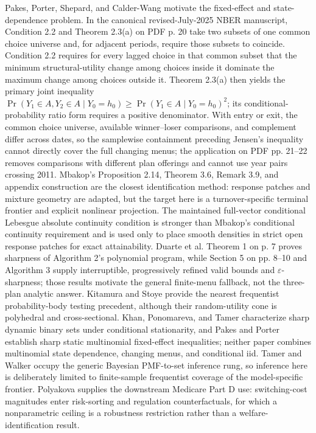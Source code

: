 \documentclass{article}
\begin{document}
Pakes, Porter, Shepard, and Calder-Wang motivate the fixed-effect and state-dependence problem. In the canonical revised-July-2025 NBER manuscript, Condition 2.2 and Theorem 2.3(a) on PDF p. 20 take two subsets of one common choice universe and, for adjacent periods, require those subsets to coincide. Condition 2.2 requires for every lagged choice in that common subset that the minimum structural-utility change among choices inside it dominate the maximum change among choices outside it. Theorem 2.3(a) then yields the primary joint inequality \(\Pr(Y_1\in A,Y_2\in A\mid Y_0=h_0)\ge\Pr(Y_1\in A\mid Y_0=h_0)^2\); its conditional-probability ratio form requires a positive denominator. With entry or exit, the common choice universe, available winner--loser comparisons, and complement differ across dates, so the samplewise containment preceding Jensen's inequality cannot directly cover the full changing menus; the application on PDF pp. 21--22 removes comparisons with different plan offerings and cannot use year pairs crossing 2011. Mbakop's Proposition 2.14, Theorem 3.6, Remark 3.9, and appendix construction are the closest identification method: response patches and mixture geometry are adapted, but the target here is a turnover-specific terminal frontier and explicit nonlinear projection. The maintained full-vector conditional Lebesgue absolute continuity condition is stronger than Mbakop's conditional continuity requirement and is used only to place smooth densities in strict open response patches for exact attainability. Duarte et al. Theorem 1 on p. 7 proves sharpness of Algorithm 2's polynomial program, while Section 5 on pp. 8--10 and Algorithm 3 supply interruptible, progressively refined valid bounds and \(\varepsilon\)-sharpness; those results motivate the general finite-menu fallback, not the three-plan analytic answer. Kitamura and Stoye provide the nearest frequentist probability-body testing precedent, although their random-utility cone is polyhedral and cross-sectional. Khan, Ponomareva, and Tamer characterize sharp dynamic binary sets under conditional stationarity, and Pakes and Porter establish sharp static multinomial fixed-effect inequalities; neither paper combines multinomial state dependence, changing menus, and conditional iid. Tamer and Walker occupy the generic Bayesian PMF-to-set inference rung, so inference here is deliberately limited to finite-sample frequentist coverage of the model-specific frontier. Polyakova supplies the downstream Medicare Part D use: switching-cost magnitudes enter risk-sorting and regulation counterfactuals, for which a nonparametric ceiling is a robustness restriction rather than a welfare-identification result.
\end{document}

